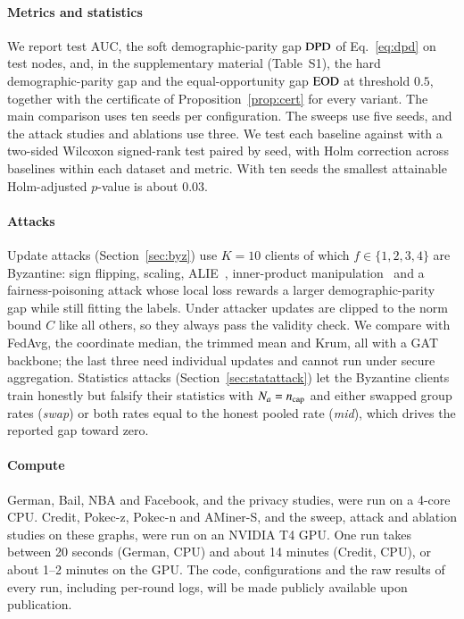 \paragraph{Metrics and statistics}
We report test AUC, the soft demographic-parity gap $\mathrm{DPD}$ of Eq.~\eqref{eq:dpd} on test nodes, and, in the supplementary material (Table~S1), the hard demographic-parity gap and the equal-opportunity gap $\mathrm{EOD}$ at threshold $0.5$, together with the certificate of Proposition~\ref{prop:cert} for every \clamp{} variant. The main comparison uses ten seeds per configuration. The sweeps use five seeds, and the attack studies and ablations use three. We test each baseline against \clamp{} with a two-sided Wilcoxon signed-rank test paired by seed, with Holm correction across baselines within each dataset and metric. With ten seeds the smallest attainable Holm-adjusted $p$-value is about 0.03.

\paragraph{Attacks}
Update attacks (Section~\ref{sec:byz}) use $K=10$ clients of which $f\in\{1,2,3,4\}$ are Byzantine: sign flipping, scaling, ALIE~\citep{baruch2019little}, inner-product manipulation~\citep{xie2019fall} and a fairness-poisoning attack whose local loss rewards a larger demographic-parity gap while still fitting the labels. Under \clamp{} attacker updates are clipped to the norm bound $C$ like all others, so they always pass the validity check. We compare \clamp{} with FedAvg, the coordinate median, the trimmed mean and Krum, all with a GAT backbone; the last three need individual updates and cannot run under secure aggregation. Statistics attacks (Section~\ref{sec:statattack}) let the Byzantine clients train honestly but falsify their statistics with $N_a=n_{\mathrm{cap}}$ and either swapped group rates (\emph{swap}) or both rates equal to the honest pooled rate (\emph{mid}), which drives the reported gap toward zero.

\paragraph{Compute}
German, Bail, NBA and Facebook, and the privacy studies, were run on a 4-core CPU. Credit, Pokec-z, Pokec-n and AMiner-S, and the sweep, attack and ablation studies on these graphs, were run on an NVIDIA T4 GPU. One run takes between 20 seconds (German, CPU) and about 14 minutes (Credit, CPU), or about 1--2 minutes on the GPU. The code, configurations and the raw results of every run, including per-round logs, will be made publicly available upon publication.
